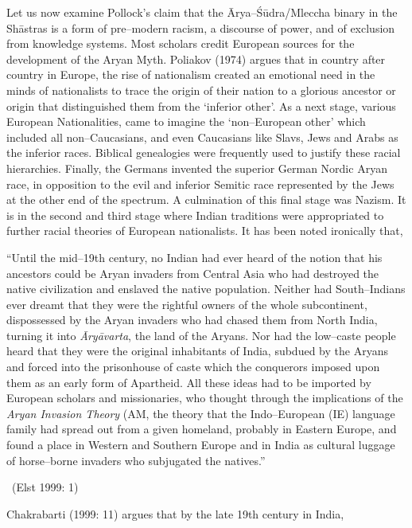 Let us now examine Pollock’s claim that the Ārya–Śūdra/Mleccha binary in the Shāstras is a form of pre–modern racism, a discourse of power, and of exclusion from knowledge systems. Most scholars credit European sources for the development of the Aryan Myth. Poliakov (1974) argues that in country after country in Europe, the rise of nationalism created an emotional need in the minds of nationalists to trace the origin of their nation to a glorious ancestor or origin that distinguished them from the ‘inferior other’. As a next stage, various European Nationalities, came to imagine the ‘non–European other’ which included all non–Caucasians, and even Caucasians like Slavs, Jews and Arabs as the inferior races. Biblical genealogies were frequently used to justify these racial hierarchies. Finally, the Germans invented the superior German Nordic Aryan race, in opposition to the evil and inferior Semitic race represented by the Jews at the other end of the spectrum. A culmination of this final stage was Nazism. It is in the second and third stage where Indian traditions were appropriated to further racial theories of European nationalists. It has been noted ironically that,

\begin{myquote}
“Until the mid–19th century, no Indian had ever heard of the notion that his ancestors could be Aryan invaders from Central Asia who had destroyed the native civilization and enslaved the native population. Neither had South–Indians ever dreamt that they were the rightful owners of the whole subcontinent, dispossessed by the Aryan invaders who had chased them from North India, turning it into \textit{Āryāvarta}, the land of the Aryans. Nor had the low–caste people heard that they were the original inhabitants of India, subdued by the Aryans and forced into the prisonhouse of caste which the conquerors imposed upon them as an early form of Apartheid. All these ideas had to be imported by European scholars and missionaries, who thought through the implications of the \textit{Aryan Invasion Theory} (AM, the theory that the Indo–European (IE) language family had spread out from a given homeland, probably in Eastern Europe, and found a place in Western and Southern Europe and in India as cultural luggage of horse–borne invaders who subjugated the natives.” 

~\hfill (Elst 1999: 1)
\end{myquote}

Chakrabarti (1999: 11) argues that by the late 19th century in India,

